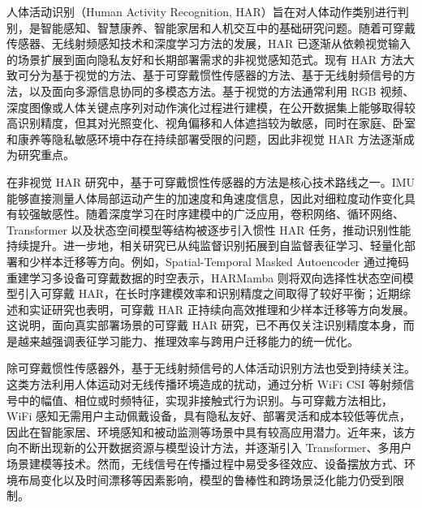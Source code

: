 人体活动识别（Human Activity Recognition, HAR）旨在对人体动作类别进行判别，是智能感知、智慧康养、智能家居和人机交互中的基础研究问题。随着可穿戴传感器、无线射频感知技术和深度学习方法的发展，HAR 已逐渐从依赖视觉输入的场景扩展到面向隐私友好和长期部署需求的非视觉感知范式。现有 HAR 方法大致可分为基于视觉的方法、基于可穿戴惯性传感器的方法、基于无线射频信号的方法，以及面向多源信息协同的多模态方法。基于视觉的方法通常利用 RGB 视频、深度图像或人体关键点序列对动作演化过程进行建模，在公开数据集上能够取得较高识别精度，但其对光照变化、视角偏移和人体遮挡较为敏感，同时在家庭、卧室和康养等隐私敏感环境中存在持续部署受限的问题，因此非视觉 HAR 方法逐渐成为研究重点。

在非视觉 HAR 研究中，基于可穿戴惯性传感器的方法是核心技术路线之一。IMU 能够直接测量人体局部运动产生的加速度和角速度信息，因此对细粒度动作变化具有较强敏感性。随着深度学习在时序建模中的广泛应用，卷积网络、循环网络、Transformer 以及状态空间模型等结构被逐步引入惯性 HAR 任务，推动识别性能持续提升。进一步地，相关研究已从纯监督识别拓展到自监督表征学习、轻量化部署和少样本迁移等方向。例如，Spatial-Temporal Masked Autoencoder 通过掩码重建学习多设备可穿戴数据的时空表示，HARMamba 则将双向选择性状态空间模型引入可穿戴 HAR，在长时序建模效率和识别精度之间取得了较好平衡；近期综述和实证研究也表明，可穿戴 HAR 正持续向高效推理和少样本迁移等方向发展\cite{miao2024spatial,li2024harmamba,qureshi2025systematic,haresamudram2025past,yu2024improving,ganesha2024few,vettoruzzo2025efficient}。这说明，面向真实部署场景的可穿戴 HAR 研究，已不再仅关注识别精度本身，而是越来越强调表征学习能力、推理效率与跨用户迁移能力的统一优化。

除可穿戴惯性传感器外，基于无线射频信号的人体活动识别方法也受到持续关注。这类方法利用人体运动对无线传播环境造成的扰动，通过分析 WiFi CSI 等射频信号中的幅值、相位或时频特征，实现非接触式行为识别。与可穿戴方法相比，WiFi 感知无需用户主动佩戴设备，具有隐私友好、部署灵活和成本较低等优点，因此在智能家居、环境感知和被动监测等场景中具有较高应用潜力。近年来，该方向不断出现新的公开数据资源与模型设计方法，并逐渐引入 Transformer、多用户场景建模等技术\cite{de2025ehunam,meneghello2023csi,sruthi2024wi,hussain2024wisigpro,huang2024wimans}。然而，无线信号在传播过程中易受多径效应、设备摆放方式、环境布局变化以及时间漂移等因素影响，模型的鲁棒性和跨场景泛化能力仍受到限制\cite{brunello2025time}。

